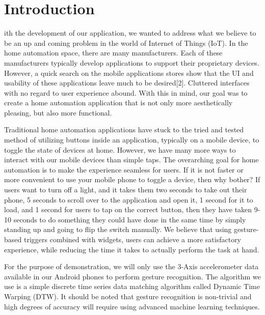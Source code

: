 \documentclass[journal]{IEEEtran}
\begin{document}
\section{Introduction}
% 
% 
% 
% 
ith the development of our application, we wanted to address what we believe to be an up and coming problem in the world of Internet of Things (IoT). In the home automation space, there are many manufacturers. Each of these manufacturers typically develop applications to support their proprietary devices. However, a quick search on the mobile applications stores show that the UI and usability of these applications leave much to be desired[2]. Cluttered interfaces with no regard to user experience abound. With this in mind, our goal was to create a home automation application that is not only more aesthetically pleasing, but also more functional.

Traditional home automation applications have stuck to the tried and tested method of utilizing buttons inside an application, typically on a mobile device, to toggle the state of devices at home. However, we have many more ways to interact with our mobile devices than simple taps. The overarching goal for home automation is to make the experience seamless for users. If it is not faster or more convenient to use your mobile phone to toggle a device, then why bother? If users want to turn off a light, and it takes them two seconds to take out their phone, 5 seconds to scroll over to the application and open it, 1 second for it to load, and 1 second for users to tap on the correct button, then they have taken 9-10 seconds to do something they could have done in the same time by simply standing up and going to flip the switch manually. We believe that using gesture-based triggers combined with widgets, users can achieve a more satisfactory experience, while reducing the time it takes to actually perform the task at hand. 

For the purpose of demonstration, we will only use the 3-Axis accelerometer data available in our Android phones to perform gesture recognition. The algorithm we use is a simple discrete time series data matching algorithm called Dynamic Time Warping (DTW). It should be noted that gesture recognition is non-trivial and high degrees of accuracy will require using advanced machine learning techniques. 
\end{document}
